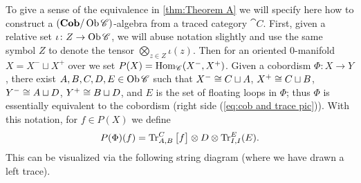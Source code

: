 \documentclass[12pt,oneside,article,draft]{memoir}
\begin{document}
To give a sense of the equivalence in \ref{thm:Theorem A} we will specify here how to construct a $(\mathbf{Cob}/\operatorname{Ob}\mathscr{C})$-algebra from a traced category $\cat{C}$.  First, given a relative set $\iota\colon Z\to\operatorname{Ob}\mathscr{C}$, we will abuse notation slightly and use the same symbol $Z$ to denote the tensor $\bigotimes_{z\in Z}\iota(z)$.  Then for an oriented 0-manifold $X=X^-\sqcup X^+$ over we set $P(X)=\operatorname{Hom}_{\mathscr{C}}(X^-,X^+)$.  Given a cobordism $\Phi\colon X\to Y$, there exist $A,B,C,D,E\in\operatorname{Ob}\mathscr{C}$ such that $X^-\cong C\sqcup A$, $X^+\cong C\sqcup B$, $Y^-\cong A\sqcup D$, $Y^+\cong B\sqcup D$, and $E$ is the set of floating loops in $\Phi$; thus $\Phi$ is essentially equivalent to the cobordism (right side (\ref{eq:cob and trace pic})).  With this notation, for $f\in P(X)$ we define 
\begin{equation}\label{eq:cob algebra formula}
 P(\Phi)(f)=\operatorname{Tr}_{A,B}^C\big[f\big]\otimes D\otimes\operatorname{Tr}^E_{I,I}(E).
\end{equation}
This can be visualized via the following string diagram (where we have drawn a left trace).
\end{document}
